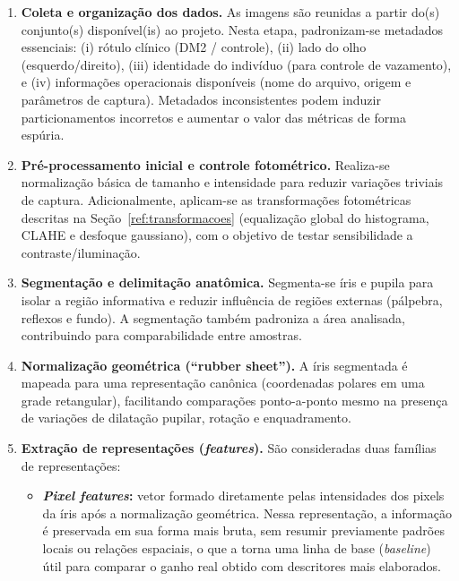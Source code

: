 \documentclass[11pt,a4paper]{article}
\begin{document}
\begin{enumerate}
    \item \textbf{Coleta e organização dos dados.}
    As imagens são reunidas a partir do(s) conjunto(s) disponível(is) ao projeto. Nesta etapa, padronizam-se metadados essenciais: (i) rótulo clínico (DM2 / controle), (ii) lado do olho (esquerdo/direito), (iii) identidade do indivíduo (para controle de vazamento), e (iv) informações operacionais disponíveis (nome do arquivo, origem e parâmetros de captura). Metadados inconsistentes podem induzir particionamentos incorretos e aumentar o valor das métricas de forma espúria.

    \item \textbf{Pré-processamento inicial e controle fotométrico.}
    Realiza-se normalização básica de tamanho e intensidade para reduzir variações triviais de captura. Adicionalmente, aplicam-se as transformações fotométricas descritas na Seção~\ref{ref:transformacoes} (equalização global do histograma, CLAHE e desfoque gaussiano), com o objetivo de testar sensibilidade a contraste/iluminação.

    \item \textbf{Segmentação e delimitação anatômica.}
    Segmenta-se íris e pupila para isolar a região informativa e reduzir influência de regiões externas (pálpebra, reflexos e fundo). A segmentação também padroniza a área analisada, contribuindo para comparabilidade entre amostras.

    \item \textbf{Normalização geométrica (``rubber sheet'').}
    A íris segmentada é mapeada para uma representação canônica (coordenadas polares em uma grade retangular), facilitando comparações ponto-a-ponto mesmo na presença de variações de dilatação pupilar, rotação e enquadramento.

\item \textbf{Extração de representações (\textit{features}).}
São consideradas duas famílias de representações:
\begin{itemize}
    \item \textbf{\textit{Pixel features}:} vetor formado diretamente pelas intensidades dos pixels da íris após a normalização geométrica. Nessa representação, a informação é preservada em sua forma mais bruta, sem resumir previamente padrões locais ou relações espaciais, o que a torna uma linha de base (\textit{baseline}) útil para comparar o ganho real obtido com descritores mais elaborados. \citep{GonzalezWoods2018}


\end{itemize}
\end{enumerate}
\end{document}
